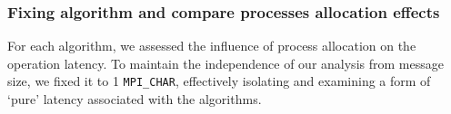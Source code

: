 \documentclass{article}
\begin{document}
\subsubsection{Fixing algorithm and compare processes allocation effects}\label{subsubsection:map}
For each algorithm, we assessed the influence of process allocation on the operation latency. To maintain the independence of our analysis from message size, we fixed it to 1 \texttt{MPI\_CHAR}, effectively isolating and examining a form of `pure' latency associated with the algorithms.

\begin{figure}[htp]
    \centering
\end{figure}
\end{document}
